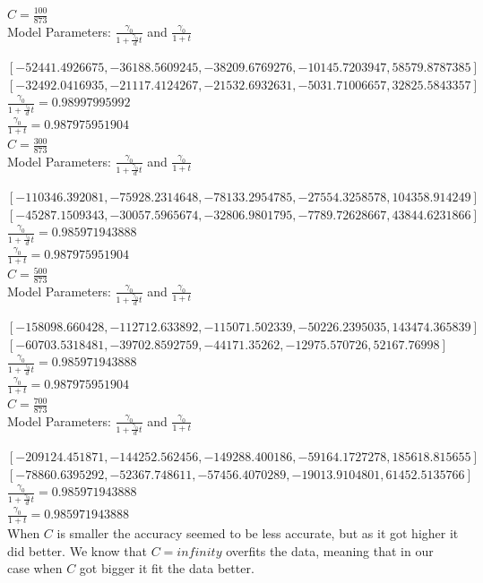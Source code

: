 \documentclass[12pt, fullpage,letterpaper]{article}
\begin{document}
\begin{enumerate}
\begin{enumerate}
$C = \frac{100}{873}$\\
Model Parameters: $\frac{\gamma_0}{1+\frac{\gamma_0}{d}t}$ and
$\frac{\gamma_0}{1+t}$

$[-52441.4926675, -36188.5609245, -38209.6769276, -10145.7203947, 58579.8787385]$\\
$[-32492.0416935, -21117.4124267, -21532.6932631, -5031.71006657, 32825.5843357]$\\

$\frac{\gamma_0}{1+\frac{\gamma_0}{d}t} = 0.98997995992$\\
$\frac{\gamma_0}{1+t} = 0.987975951904$\\

$C = \frac{300}{873}$\\
Model Parameters: $\frac{\gamma_0}{1+\frac{\gamma_0}{d}t}$ and
$\frac{\gamma_0}{1+t}$

$[-110346.392081, -75928.2314648, -78133.2954785, -27554.3258578, 104358.914249]$\\
$[-45287.1509343, -30057.5965674, -32806.9801795, -7789.72628667, 43844.6231866]$\\

$\frac{\gamma_0}{1+\frac{\gamma_0}{d}t} = 0.985971943888$\\
$\frac{\gamma_0}{1+t} = 0.987975951904$\\

$C = \frac{500}{873}$\\
Model Parameters: $\frac{\gamma_0}{1+\frac{\gamma_0}{d}t}$ and
$\frac{\gamma_0}{1+t}$

$[-158098.660428, -112712.633892, -115071.502339, -50226.2395035, 143474.365839]$\\
$[-60703.5318481, -39702.8592759, -44171.35262, -12975.570726, 52167.76998]$\\

$\frac{\gamma_0}{1+\frac{\gamma_0}{d}t} = 0.985971943888$\\
$\frac{\gamma_0}{1+t} = 0.987975951904$\\

$C = \frac{700}{873}$\\
Model Parameters: $\frac{\gamma_0}{1+\frac{\gamma_0}{d}t}$ and
$\frac{\gamma_0}{1+t}$

$[-209124.451871, -144252.562456, -149288.400186, -59164.1727278, 185618.815655]$\\
$[-78860.6395292, -52367.748611, -57456.4070289, -19013.9104801, 61452.5135766]$\\

$\frac{\gamma_0}{1+\frac{\gamma_0}{d}t} = 0.985971943888$\\
$\frac{\gamma_0}{1+t} = 0.985971943888$\\


When $C$ is smaller the accuracy seemed to be less accurate, but as it got higher it did better.
We know that $C = infinity$ overfits the data, meaning that in our case when $C$ got bigger it fit the data better.


\end{enumerate}
\end{enumerate}
\end{document}

